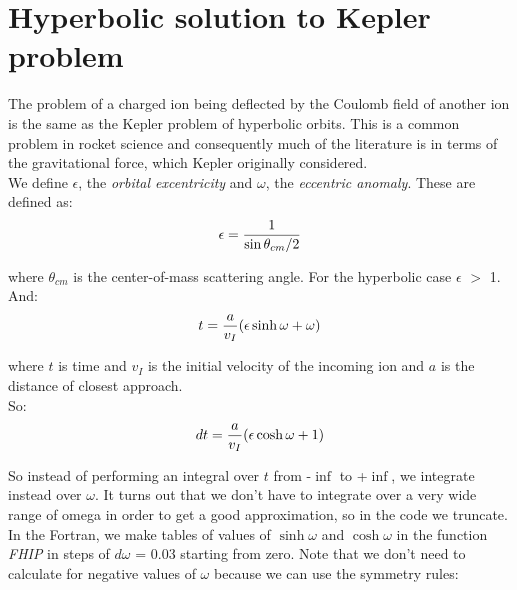 \chapter{Hyperbolic solution to Kepler problem}
\label{chapt:kepler}

The problem of a charged ion being deflected by the Coulomb field of another
ion is the same as the Kepler problem of hyperbolic orbits. This is a common
problem in rocket science and consequently much of the literature is in
terms of the gravitational force, which Kepler originally considered.\\

We define $\epsilon$, the \emph{orbital excentricity} and $\omega$, the \emph{
eccentric anomaly}. These are defined as:\\

\begin{equation}
\epsilon = {1 \over \sin{\theta_{cm} / 2}}
\end{equation}

where $\theta_{cm}$ is the center-of-mass scattering angle. For the
hyperbolic case $\epsilon$ $>$ 1.\\

And:\\

\begin{equation}
t = {a \over v_I} (\epsilon \sinh \omega + \omega)
\end{equation}

where $t$ is time and $v_I$ is the initial velocity of the incoming ion and
$a$ is the distance of closest approach.\\

So:\\

\begin{equation}
dt = {a \over v_I} (\epsilon \cosh \omega + 1)
\end{equation}

So instead of performing an integral over $t$ from -$\inf$ to +$\inf$, we
integrate instead over $\omega$. It turns out that we don't have to
integrate over a very wide range of omega in order to get a good
approximation, so in the code we truncate.\\

In the Fortran, we make tables of values of $\sinh\omega$ and $\cosh\omega$
in the function \emph{FHIP} in steps of $d\omega$ = 0.03 starting from zero.
Note that we don't need to calculate for negative values of $\omega$ because
we can use the symmetry rules:\\

